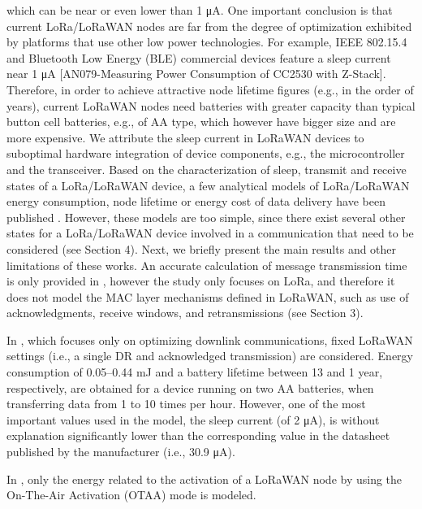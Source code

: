 	which can be near or even lower than 1 μA.
One important conclusion is that current LoRa/LoRaWAN nodes are far from the degree of optimization exhibited by platforms that use other low power technologies.
For example,
	IEEE 802.15.4 and Bluetooth Low Energy (BLE) commercial devices feature a sleep current near 1 μA [AN079-Measuring Power Consumption of CC2530 with Z-Stack]\cite{aguilar_opportunistic_2017}.
Therefore,
	in order to achieve attractive node lifetime figures (e.g.,
	in the order of years),
	current LoRaWAN nodes need batteries with greater capacity than typical button cell batteries,
	e.g.,
	of AA type,
	which however have bigger size and are more expensive.
We attribute the sleep current in LoRaWAN devices to suboptimal hardware integration of device components,
	e.g.,
	the microcontroller and the transceiver.
Based on the characterization of sleep,
	transmit and receive states of a LoRa/LoRaWAN device,
	a few analytical models of LoRa/LoRaWAN energy consumption,
	node lifetime or energy cost of data delivery have been published  \cite{kim_cooperative_2017}
\cite{conus_event-driven_2016}
\cite{sartori_smart_2016}
\cite{toussaint_performance_2016}.
However,
	these models are too simple,
	since there exist several other states for a LoRa/LoRaWAN device involved in a communication that need to be considered (see Section 4).
Next,
	we briefly present the main results and other limitations of these works.
An accurate calculation of message transmission time is only provided in \cite{sartori_smart_2016},
	however the study only focuses on LoRa,
	and therefore it does not model the MAC layer mechanisms defined in LoRaWAN,
	such as use of acknowledgments,
	receive windows,
	and retransmissions (see Section 3).

In \cite{kim_cooperative_2017},
	which focuses only on optimizing downlink communications,
	fixed LoRaWAN settings (i.e.,
	a single DR and acknowledged transmission) are considered.
Energy consumption of 0.05–0.44 mJ and a battery lifetime between 13 and 1 year,
	respectively,
	are obtained for a device running on two AA batteries,
	when transferring data from 1 to 10 times per hour.
However,
	one of the most important values used in the model,
	the sleep current (of 2 μA),
	is without explanation significantly lower than the corresponding value in the datasheet published by the manufacturer (i.e., 30.9 μA).

In \cite{toussaint_performance_2016},
	only the energy related to the activation of a LoRaWAN node by using the On-The-Air Activation (OTAA) mode is modeled.

